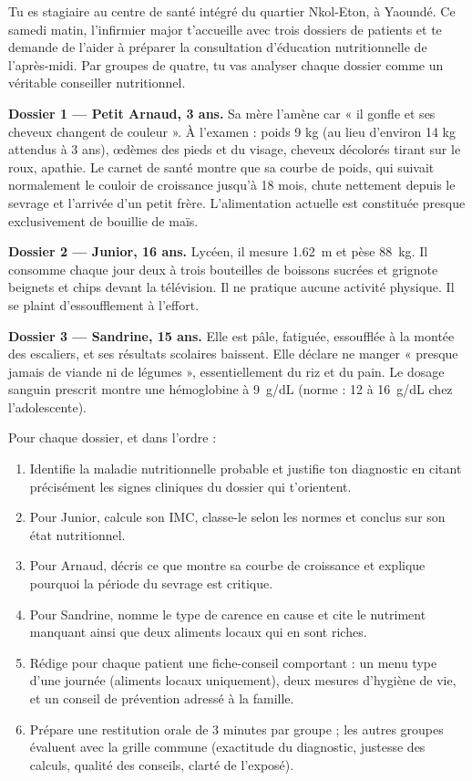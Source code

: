 \documentclass[11pt]{article}
\newcounter{popsec}
\newcounter{popsub}
\newcommand{\courssub}[1]{%
  \stepcounter{popsub}%
  \par\vspace{9pt}\noindent{\popxbold\fontsize{11.5}{13}\selectfont\color{popink}{\color{poporange}\thepopsec.\thepopsub}\hspace{6pt}#1}\par\nopagebreak\vspace{4pt}
}
\begin{document}
\courssub{Situation}

Tu es stagiaire au centre de santé intégré du quartier Nkol-Eton, à Yaoundé. Ce samedi matin, l'infirmier major t'accueille avec trois dossiers de patients et te demande de l'aider à préparer la consultation d'éducation nutritionnelle de l'après-midi. Par groupes de quatre, tu vas analyser chaque dossier comme un véritable conseiller nutritionnel.

\textbf{Dossier 1 — Petit Arnaud, 3 ans.} Sa mère l'amène car « il gonfle et ses cheveux changent de couleur ». À l'examen : poids 9 kg (au lieu d'environ 14 kg attendus à 3 ans), œdèmes des pieds et du visage, cheveux décolorés tirant sur le roux, apathie. Le carnet de santé montre que sa courbe de poids, qui suivait normalement le couloir de croissance jusqu'à 18 mois, chute nettement depuis le sevrage et l'arrivée d'un petit frère. L'alimentation actuelle est constituée presque exclusivement de bouillie de maïs.

\textbf{Dossier 2 — Junior, 16 ans.} Lycéen, il mesure \SI{1,62}{m} et pèse \SI{88}{kg}. Il consomme chaque jour deux à trois bouteilles de boissons sucrées et grignote beignets et chips devant la télévision. Il ne pratique aucune activité physique. Il se plaint d'essoufflement à l'effort.

\textbf{Dossier 3 — Sandrine, 15 ans.} Elle est pâle, fatiguée, essoufflée à la montée des escaliers, et ses résultats scolaires baissent. Elle déclare ne manger « presque jamais de viande ni de légumes », essentiellement du riz et du pain. Le dosage sanguin prescrit montre une hémoglobine à \SI{9}{g/dL} (norme : 12 à \SI{16}{g/dL} chez l'adolescente).

\courssub{Consignes}

Pour chaque dossier, et dans l'ordre :

\begin{enumerate}
\item Identifie la maladie nutritionnelle probable et justifie ton diagnostic en citant précisément les signes cliniques du dossier qui t'orientent.
\item Pour Junior, calcule son IMC, classe-le selon les normes et conclus sur son état nutritionnel.
\item Pour Arnaud, décris ce que montre sa courbe de croissance et explique pourquoi la période du sevrage est critique.
\item Pour Sandrine, nomme le type de carence en cause et cite le nutriment manquant ainsi que deux aliments locaux qui en sont riches.
\item Rédige pour chaque patient une fiche-conseil comportant : un menu type d'une journée (aliments locaux uniquement), deux mesures d'hygiène de vie, et un conseil de prévention adressé à la famille.
\item Prépare une restitution orale de 3 minutes par groupe ; les autres groupes évaluent avec la grille commune (exactitude du diagnostic, justesse des calculs, qualité des conseils, clarté de l'exposé).
\end{enumerate}
\end{document}
